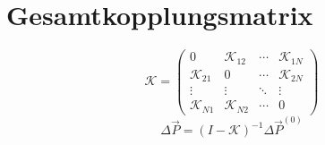 \section{Gesamtkopplungsmatrix}
\[
\mathcal{K} = \begin{pmatrix}
0 & \mathcal{K}_{12} & \cdots & \mathcal{K}_{1N} \\
\mathcal{K}_{21} & 0 & \cdots & \mathcal{K}_{2N} \\
\vdots & \vdots & \ddots & \vdots \\
\mathcal{K}_{N1} & \mathcal{K}_{N2} & \cdots & 0
\end{pmatrix}
\]
\[
\Delta\vec{P} = (I - \mathcal{K})^{-1} \Delta\vec{P}^{(0)}
\]